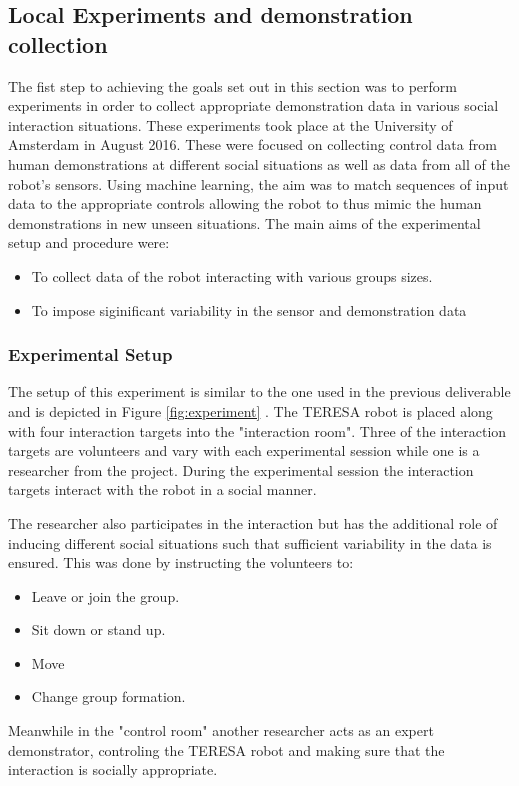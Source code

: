 \documentclass[a4paper,11pt]{report}
\begin{document}
\subsection{Local Experiments and demonstration collection}
\label{sec:demonstration_experiment}
The fist step to achieving the goals set out in this section was to perform experiments in order to collect appropriate demonstration data in various social interaction situations. These experiments took place at the University of Amsterdam in August 2016. These were focused on collecting control data from human demonstrations at different social situations as well as data from all of the robot's sensors. Using machine learning, the aim was to match sequences of input data to the appropriate controls allowing the robot to thus mimic the human demonstrations in new unseen situations. The main aims of the experimental setup and procedure were:

\begin{itemize}
\item To collect data of the robot interacting with various groups sizes.
\item To impose siginificant variability in the sensor and demonstration data 
\end{itemize}

\subsubsection{Experimental Setup}
The setup of this experiment is similar to the one used in the previous deliverable and is depicted in Figure \ref{fig:experiment} . The TERESA robot is placed along with four interaction targets into the "interaction room". Three of the interaction targets are volunteers and vary with each experimental session while one is a researcher from the project. During the experimental session the interaction targets interact with the robot in a social manner. 

The researcher also participates in the interaction but has the additional role of inducing different social situations such that sufficient variability in the data is ensured. This was done by instructing the volunteers to:

\begin{itemize}
 	\item Leave or join the group.
 	\item Sit down or stand up.
 	\item Move
 	\item Change group formation.
\end{itemize}
 Meanwhile in the "control room" another researcher acts as an expert demonstrator, controling the TERESA robot and making sure that the interaction is socially appropriate. 
\end{document}
